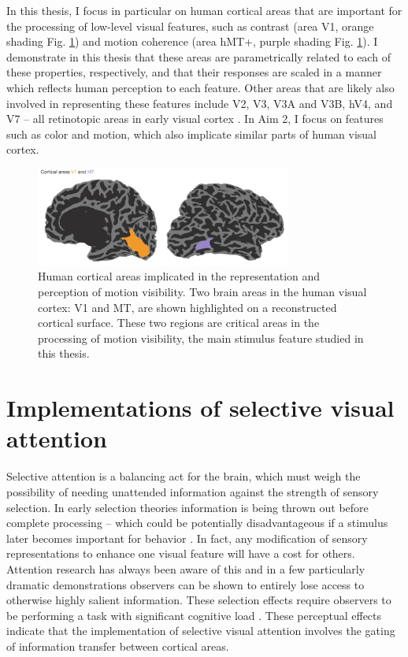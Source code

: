 In this thesis, I focus in particular on human cortical areas that are important for the processing of low-level visual features, such as contrast (area V1, orange shading Fig. \ref{fig:c0f2}) and motion coherence (area hMT+, purple shading Fig. \ref{fig:c0f2}). I demonstrate in this thesis that these areas are parametrically related to each of these properties, respectively, and that their responses are scaled in a manner which reflects human perception to each feature. Other areas that are likely also involved in representing these features include V2, V3, V3A and V3B, hV4, and V7 -- all retinotopic areas in early visual cortex \citep{Wandell2007-pr}. In Aim 2, I focus on features such as color and motion, which also implicate similar parts of human visual cortex.

\begin{figure}[ht]
\centering
\includegraphics[keepaspectratio,width=0.75\textwidth]{figs_c0/brains.pdf}
\caption[Brain regions implicated in motion visibility perception]{Human cortical areas implicated in the representation and perception of motion visibility. Two brain areas in the human visual cortex: V1 and MT, are shown highlighted on a reconstructed cortical surface. These two regions are critical areas in the processing of motion visibility, the main stimulus feature studied in this thesis.}
\label{fig:c0f2}
\end{figure}

\section{Implementations of selective visual attention}

Selective attention is a balancing act for the brain, which must weigh the possibility of needing unattended information against the strength of sensory selection. In early selection theories information is being thrown out before complete processing -- which could be potentially disadvantageous if a stimulus later becomes important for behavior \citep{Mack1998-nq}. In fact, any modification of sensory representations to enhance one visual feature will have a cost for others. Attention research has always been aware of this and in a few particularly dramatic demonstrations \citep{Haines1991-si,Mack1998-nq,Neisser1979-mm,Simons1999-ng} observers can be shown to entirely lose access to otherwise highly salient information. These selection effects require observers to be performing a task with significant cognitive load \citep{Lavie2005-aw,Lavie2004-ub,Rees1997-hd}. These perceptual effects indicate that the implementation of selective visual attention involves the gating of information transfer between cortical areas.

